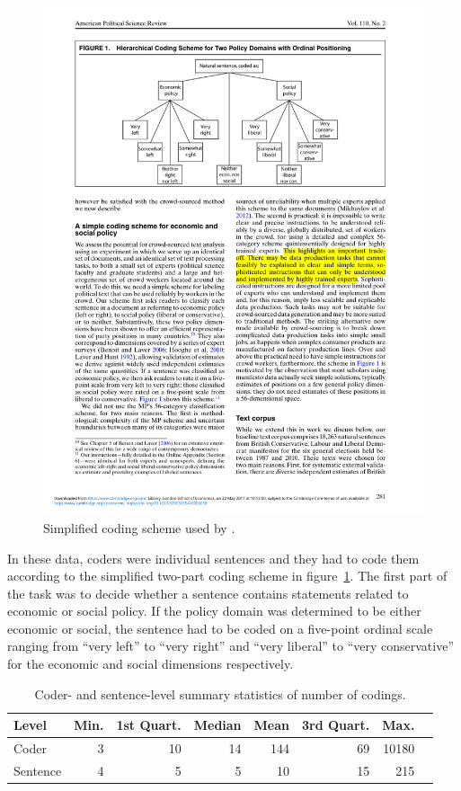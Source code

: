 \documentclass[a4paper, 12pt]{article}
\begin{document}
\begin{figure}[htpb]
  \centering
  \includegraphics[width=0.8\linewidth]{coding-scheme-benoitetal.pdf}
  \caption{Simplified coding scheme used by \citet[taken from figure~1 on p.~281]{Benoit2016}.}
  \label{fig:coding-scheme}
\end{figure}

In these data, coders were individual sentences and they had to code them according to the simplified two-part coding scheme in figure~\ref{fig:coding-scheme}. The first part of the task was to decide whether a sentence contains statements related to economic or social policy. If the policy domain was determined to be either economic or social, the sentence had to be coded on a five-point ordinal scale ranging from \enquote{very left} to \enquote{very right} and \enquote{very liberal} to \enquote{very conservative} for the economic and social dimensions respectively.

\begin{table}[htbp]
  \centering
  \begin{tabular}{lrrrrrrr}
    \toprule
    Level & Min. & 1st Quart. & Median & Mean & 3rd Quart. & Max. \\
    \midrule
    Coder & 3 & 10 & 14 & 144 & 69 & 10180 \\
    Sentence & 4 & 5 & 5 & 10 & 15 & 215 \\
    \bottomrule
  \end{tabular}
  \caption{Coder- and sentence-level summary statistics of number of codings.}
  \label{tab:summary-codings}
\end{table}
\end{document}
